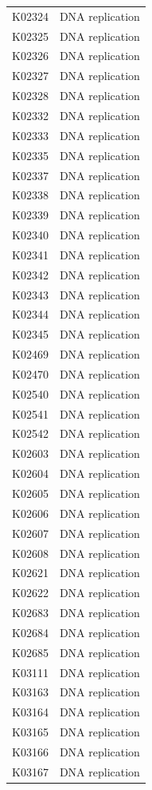 \begin{longtable}{@{}l l@{}}
K02324 & DNA replication \\
K02325 & DNA replication \\
K02326 & DNA replication \\
K02327 & DNA replication \\
K02328 & DNA replication \\
K02332 & DNA replication \\
K02333 & DNA replication \\
K02335 & DNA replication \\
K02337 & DNA replication \\
K02338 & DNA replication \\
K02339 & DNA replication \\
K02340 & DNA replication \\
K02341 & DNA replication \\
K02342 & DNA replication \\
K02343 & DNA replication \\
K02344 & DNA replication \\
K02345 & DNA replication \\
K02469 & DNA replication \\
K02470 & DNA replication \\
K02540 & DNA replication \\
K02541 & DNA replication \\
K02542 & DNA replication \\
K02603 & DNA replication \\
K02604 & DNA replication \\
K02605 & DNA replication \\
K02606 & DNA replication \\
K02607 & DNA replication \\
K02608 & DNA replication \\
K02621 & DNA replication \\
K02622 & DNA replication \\
K02683 & DNA replication \\
K02684 & DNA replication \\
K02685 & DNA replication \\
K03111 & DNA replication \\
K03163 & DNA replication \\
K03164 & DNA replication \\
K03165 & DNA replication \\
K03166 & DNA replication \\
K03167 & DNA replication \\

\end{longtable}
